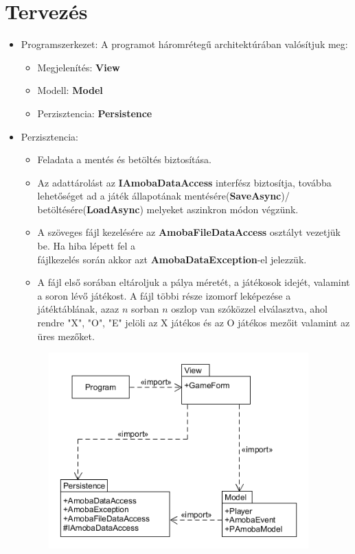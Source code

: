 \documentclass[11pt,a4paper]{article}
\begin{document}
\section{Tervezés}
\begin{itemize}
	\item Programszerkezet: A programot háromrétegű architektúrában valósítjuk meg:
	\begin{itemize}
		\item Megjelenítés: \textbf{View}
		\item Modell: \textbf{Model}
		\item Perzisztencia: \textbf{Persistence}
	\end{itemize}
	\item Perzisztencia:
	\begin{itemize}
		\item Feladata a mentés és betöltés biztosítása.
		\item Az adattárolást az \textbf{IAmobaDataAccess} interfész biztosítja, továbba
		lehetőséget ad a játék állapotának mentésére(\textbf{SaveAsync})/
		betöltésére(\textbf{LoadAsync})	melyeket aszinkron módon végzünk.
		\item A szöveges fájl kezelésére az \textbf{AmobaFileDataAccess} osztályt vezetjük be.
		Ha hiba lépett fel a\\fájlkezelés során akkor azt \textbf{AmobaDataException}-el jelezzük.
		\item A fájl első sorában eltároljuk a pálya méretét, a játékosok idejét, valamint
		a soron lévő játékost. A fájl többi része izomorf leképezése a játéktáblának, azaz
		$n$ sorban $n$ oszlop van szóközzel elválasztva, ahol rendre "X", "O", "E" jelöli
		az X játékos és az O játékos mezőit valamint az üres mezőket.
	\end{itemize}
	\begin{figure}[h]
		\centering
		\includegraphics[width=10cm]{UMLs/Package.png}

\end{figure}
\end{itemize}
\end{document}
